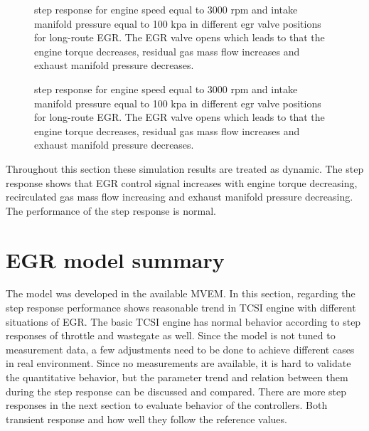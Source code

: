 \begin{figure}[tbp]
  \centering
  \qquad
  \caption{\label{fig:step_response_long_3000_100_1}%
    step response for engine speed equal to 3000 rpm and intake manifold pressure equal to 100 kpa in different egr valve positions for long-route EGR. The EGR valve opens which leads to that the engine torque decreases, residual gas mass flow increases and exhaust manifold pressure decreases.}
\end{figure}

\begin{figure}[tbp]
  \centering
  \qquad
  \caption{\label{fig:step_response_long_3000_100_2}%
    step response for engine speed equal to 3000 rpm and intake manifold pressure equal to 100 kpa in different egr valve positions for long-route EGR. The EGR valve opens which leads to that the engine torque decreases, residual gas mass flow increases and exhaust manifold pressure decreases.}
\end{figure}

Throughout this section these simulation results are treated as dynamic. The step response shows that EGR control signal increases with engine torque decreasing, recirculated gas mass flow increasing and exhaust manifold pressure decreasing. The performance of the step response is normal. 

\section{EGR model summary}
The model was developed in the available MVEM. In this section, regarding the step response performance shows reasonable trend in TCSI engine with different situations of EGR. The basic TCSI engine has normal behavior according to step responses of throttle and wastegate as well. Since the model is not tuned to measurement data, a few adjustments need to be done to achieve different cases in real environment. Since no measurements are available, it is hard to validate the quantitative behavior, but the parameter trend and relation between them during the step response can be discussed and compared. There are more step responses in the next section to evaluate behavior of the controllers. Both transient response and how well they follow the reference values.

